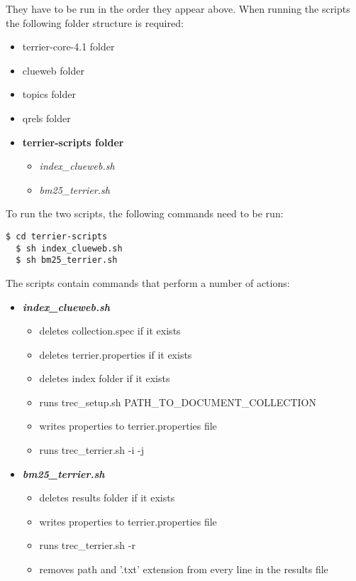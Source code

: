 \documentclass{article} %
\begin{document}
They have to be run in the order they appear above. When running the scripts the following folder structure is required:

\begin{itemize}
    \item terrier-core-4.1 folder
    \item clueweb folder
    \item topics folder
    \item qrels folder
    \item \textbf{terrier-scripts folder}
    \begin{itemize}
        \item \textit{index\_clueweb.sh}
        \item \textit{bm25\_terrier.sh}
    \end{itemize}
\end{itemize}

To run the two scripts, the following commands need to be run:

\begin{lstlisting}[style=Bash]
  $ cd terrier-scripts
  $ sh index_clueweb.sh
  $ sh bm25_terrier.sh
\end{lstlisting}

The scripts contain commands that perform a number of actions:
\begin{itemize}
    \item \textit{\textbf{index\_clueweb.sh}}
    \begin{itemize}
        \item deletes collection.spec if it exists
        \item deletes terrier.properties if it exists
        \item deletes index folder if it exists
        \item runs trec\_setup.sh PATH\_TO\_DOCUMENT\_COLLECTION
        \item writes properties to terrier.properties file
        \item runs trec\_terrier.sh -i -j
    \end{itemize}
    \item \textit{\textbf{bm25\_terrier.sh}}
    \begin{itemize}
        \item deletes results folder if it exists
        \item writes properties to terrier.properties file
        \item runs trec\_terrier.sh -r
        \item removes path and '.txt' extension from every line in the results file
    \end{itemize}
\end{itemize}
\end{document}
